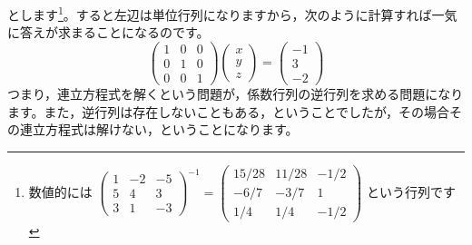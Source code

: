 \documentclass{ltjsbook}
\begin{document}
とします\footnote{数値的には
$\begin{pmatrix} 1 & -2 & -5 \\
                5 & 4  & 3  \\
                3 & 1  & -3\end{pmatrix}^{-1}
	=
	\begin{pmatrix} 15/28 & 11/28 & -1/2 \\
                -6/7  & -3/7  & 1    \\
                1/4   & 1/4   & -1/2\end{pmatrix}
$
という行列です}。すると左辺は単位行列になりますから，次のように計算すれば一気に答えが求まることになるのです。
\[
	\begin{pmatrix} 1 & 0 & 0 \\
                0 & 1 & 0 \\
                0 & 0 & 1\end{pmatrix}
	\begin{pmatrix} x \\ y \\ z \end{pmatrix}
	=
	\begin{pmatrix} -1 \\ 3 \\ -2 \end{pmatrix}
\]
つまり，連立方程式を解くという問題が，係数行列の逆行列を求める問題になります。また，逆行列は存在しないこともある，ということでしたが，その場合その連立方程式は解けない，ということになります。
\end{document}
